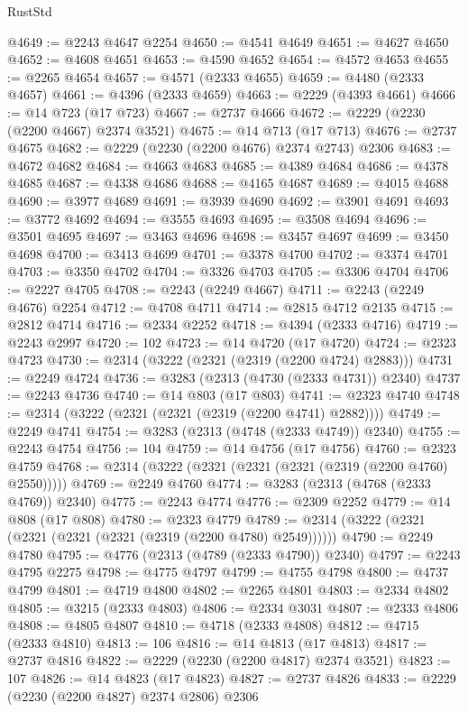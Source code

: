 \begin{lexlean}{RustStd}
\begin{coremodule}
{\begin{coremodule}
{{{{{{{{{{{{{{{{{{{{{{{{{{{{{{{{{{@4649 := @2243 @4647 @2254
@4650 := @4541 @4649
@4651 := @4627 @4650
@4652 := @4608 @4651
@4653 := @4590 @4652
@4654 := @4572 @4653
@4655 := @2265 @4654
@4657 := @4571 (@2333 @4655)
@4659 := @4480 (@2333 @4657)
@4661 := @4396 (@2333 @4659)
@4663 := @2229 (@4393 @4661)
@4666 := @14 @723 (@17 @723)
@4667 := @2737 @4666
@4672 := @2229 (@2230 (@2200 @4667) @2374 @3521)
@4675 := @14 @713 (@17 @713)
@4676 := @2737 @4675
@4682 := @2229 (@2230 (@2200 @4676) @2374 @2743) @2306
@4683 := @4672 @4682
@4684 := @4663 @4683
@4685 := @4389 @4684
@4686 := @4378 @4685
@4687 := @4338 @4686
@4688 := @4165 @4687
@4689 := @4015 @4688
@4690 := @3977 @4689
@4691 := @3939 @4690
@4692 := @3901 @4691
@4693 := @3772 @4692
@4694 := @3555 @4693
@4695 := @3508 @4694
@4696 := @3501 @4695
@4697 := @3463 @4696
@4698 := @3457 @4697
@4699 := @3450 @4698
@4700 := @3413 @4699
@4701 := @3378 @4700
@4702 := @3374 @4701
@4703 := @3350 @4702
@4704 := @3326 @4703
@4705 := @3306 @4704
@4706 := @2227 @4705
@4708 := @2243 (@2249 @4667)
@4711 := @2243 (@2249 @4676) @2254
@4712 := @4708 @4711
@4714 := @2815 @4712 @2135
@4715 := @2812 @4714
@4716 := @2334 @2252
@4718 := @4394 (@2333 @4716)
@4719 := @2243 @2997
@4720 := 102
@4723 := @14 @4720 (@17 @4720)
@4724 := @2323 @4723
@4730 := @2314 (@3222 (@2321 (@2319 (@2200 @4724) @2883)))
@4731 := @2249 @4724
@4736 := @3283 (@2313 (@4730 (@2333 @4731)) @2340)
@4737 := @2243 @4736
@4740 := @14 @803 (@17 @803)
@4741 := @2323 @4740
@4748 := @2314 (@3222 (@2321 (@2321 (@2319 (@2200 @4741) @2882))))
@4749 := @2249 @4741
@4754 := @3283 (@2313 (@4748 (@2333 @4749)) @2340)
@4755 := @2243 @4754
@4756 := 104
@4759 := @14 @4756 (@17 @4756)
@4760 := @2323 @4759
@4768 := @2314 (@3222 (@2321 (@2321 (@2321 (@2319 (@2200 @4760) @2550)))))
@4769 := @2249 @4760
@4774 := @3283 (@2313 (@4768 (@2333 @4769)) @2340)
@4775 := @2243 @4774
@4776 := @2309 @2252
@4779 := @14 @808 (@17 @808)
@4780 := @2323 @4779
@4789 := @2314 (@3222 (@2321 (@2321 (@2321 (@2321 (@2319 (@2200 @4780) @2549))))))
@4790 := @2249 @4780
@4795 := @4776 (@2313 (@4789 (@2333 @4790)) @2340)
@4797 := @2243 @4795 @2275
@4798 := @4775 @4797
@4799 := @4755 @4798
@4800 := @4737 @4799
@4801 := @4719 @4800
@4802 := @2265 @4801
@4803 := @2334 @4802
@4805 := @3215 (@2333 @4803)
@4806 := @2334 @3031
@4807 := @2333 @4806
@4808 := @4805 @4807
@4810 := @4718 (@2333 @4808)
@4812 := @4715 (@2333 @4810)
@4813 := 106
@4816 := @14 @4813 (@17 @4813)
@4817 := @2737 @4816
@4822 := @2229 (@2230 (@2200 @4817) @2374 @3521)
@4823 := 107
@4826 := @14 @4823 (@17 @4823)
@4827 := @2737 @4826
@4833 := @2229 (@2230 (@2200 @4827) @2374 @2806) @2306
}}}}}}}}}}}}}}}}}}}}}}}}}}}}}}}}}}
\end{coremodule}}
\end{coremodule}
\end{lexlean}
